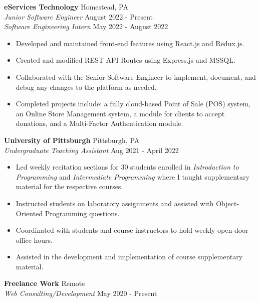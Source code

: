 \documentclass[letterpaper]{article}
\begin{document}
\textbf{eServices Technology} \hfill Homestead, PA\\
\textit{Junior Software Engineer} \hfill August 2022 - Present\\
\textit{Software Engineering Intern} \hfill May 2022 - August 2022\\
\vspace{-1mm}
\begin{itemize} \itemsep 1pt
	\item Developed and maintained front-end features using React.js and Redux.js.
	\item Created and modified REST API Routes using Express.js and MSSQL.
    \item Collaborated with the Senior Software Engineer to implement, document, and debug any changes to the platform as needed.
    \item Completed projects include: a fully cloud-based Point of Sale (POS) system, an Online Store Management system, a module for clients to accept donations, and a Multi-Factor Authentication module.
\end{itemize}
\vspace{-1mm}
\textbf{University of Pittsburgh} \hfill Pittsburgh, PA\\
\textit{Undergraduate Teaching Assistant} \hfill Aug 2021 - April 2022\\
\vspace{-1mm}
\begin{itemize} \itemsep 1pt
	\item Led weekly recitation sections for 30 students enrolled in \textit{Introduction to Programming} and \textit{Intermediate Programming} where I taught supplementary material for the respective courses.
	\item Instructed students on laboratory assignments and assisted with Object-Oriented Programming questions.
	\item Coordinated with students and course instructors to hold weekly open-door office hours.
    \item Assisted in the development and implementation of course supplementary material.
\end{itemize}
\textbf{Freelance Work} \hfill Remote \\
\textit{Web Consulting/Development} \hfill May 2020 - Present\\
\vspace{-1mm}
\end{document}
